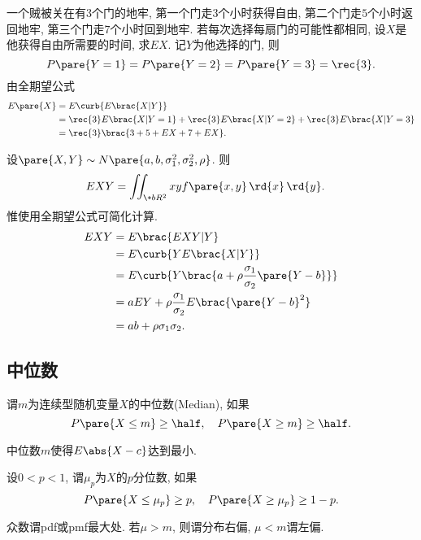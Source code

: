 \documentclass[../Statistics.tex]{subfiles}
\begin{document}
\begin{sample}
    \begin{ex}
        一个贼被关在有$3$个门的地牢, 第一个门走$3$个小时获得自由, 第二个门走$5$个小时返回地牢, 第三个门走$7$个小时回到地牢. 若{\color{red}每次选择每扇门的可能性都相同}, 设$X$是他获得自由所需要的时间, 求$EX$. 记$Y$为他选择的门, 则
        \[ P\pare{Y = 1} = P\pare{Y = 2} = P\pare{Y = 3} = \rec{3}. \]
        由全期望公式
        \begin{align*}
            E\pare{X} &= E\curb{E\brac{X\vert Y}} \\
            &= \rec{3} E\brac{X\vert Y = 1} + \rec{3} E\brac{X\vert Y = 2} + \rec{3} E\brac{X\vert Y = 3} \\
            &= \rec{3}\brac{3 + 5 + EX + 7 + EX}.
        \end{align*}
    \end{ex}
\end{sample}
\begin{sample}
    \begin{ex}
        设$\pare{X,Y} \sim N\pare{a,b,\sigma_1^2,\sigma_2^2, \rho}$. 则
        \begin{align*}
            EXY &= \iint_{\+bR^2} xy f\pare{x,y}\,\rd{x}\,\rd{y}.
        \end{align*}
        惟使用全期望公式可简化计算.
        \begin{align*}
            EXY &= E\brac{EXY\vert Y} \\
            &= E\curb{Y E\brac{X\vert Y}} \\
            &= E\curb{Y\brac{a+\rho \frac{\sigma_1}{\sigma_2}\pare{Y-b}}} \\
            &= aEY + \rho \frac{\sigma_1}{\sigma_2}E\brac{\pare{Y-b}^2} \\
            &= ab + \rho \sigma_1 \sigma_2.
        \end{align*}
    \end{ex}
\end{sample}



\subsection{中位数} %
\label{sub:中位数}

\begin{definition}
    谓$m$为连续型随机变量$X$的中位数(Median), 如果
    \[ P\pare{X\le m} \ge \half, \quad P\pare{X\ge m} \ge \half. \]
\end{definition}
\begin{sample}
    \begin{ex}
        中位数$m$使得$E\abs{X-c}$达到最小.
    \end{ex}
\end{sample}
设$0<p<1$, 谓$\mu_p$为$X$的$p$分位数, 如果
\[ P\pare{X\le \mu_p} \ge p,\quad P\pare{X\ge \mu_p} \ge 1-p. \]
\par
众数谓pdf或pmf最大处. 若$\mu>m$, 则谓分布右偏, $\mu < m$谓左偏.
\end{document}
